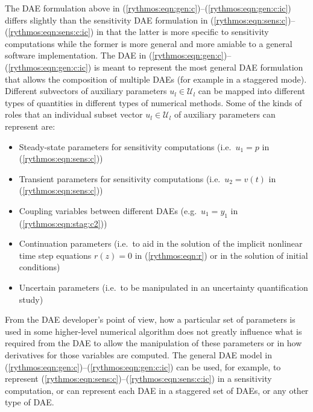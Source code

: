 \documentclass[pdf,ps2pdf,11pt]{SANDreport}
\begin{document}
The DAE formulation above in
(\ref{rythmos:eqn:gen:c})--(\ref{rythmos:eqn:gen:c:ic}) differs slightly than
the sensitivity DAE formulation in
(\ref{rythmos:eqn:sens:c})--(\ref{rythmos:eqn:sens:c:ic}) in that the latter
is more specific to sensitivity computations while the former is more general
and more amiable to a general software implementation.  The DAE in
(\ref{rythmos:eqn:gen:c})--(\ref{rythmos:eqn:gen:c:ic}) is meant to represent
the most general DAE formulation that allows the composition of multiple DAEs
(for example in a staggered mode).  Different subvectors of auxiliary
parameters $u_l\in\mathcal{U}_l$ can be mapped into different types of
quantities in different types of numerical methods.  Some of the kinds of
roles that an individual subset vector $u_l\in\mathcal{U}_l$ of auxiliary
parameters can represent are:
%
\begin{itemize}
%
{}\item Steady-state parameters for sensitivity computations (i.e.\ $u_1 =
p$ in (\ref{rythmos:eqn:sens:c}))
%
{}\item Transient parameters for sensitivity computations (i.e.\ $u_2 = v(t)$
in (\ref{rythmos:eqn:sens:c}))
%
{}\item Coupling variables between different DAEs (e.g.\ $u_1 = y_1$ in
(\ref{rythmos:eqn:stag:c2}))
%
{}\item Continuation parameters (i.e.\ to aid in the solution of the implicit
nonlinear time step equations $r(z)=0$ in (\ref{rythmos:eqn:r}) or in the
solution of initial conditions)
%
{}\item Uncertain parameters (i.e.\ to be manipulated in an uncertainty
quantification study)
%
\end{itemize}

From the DAE developer's point of view, how a particular set of parameters is
used in some higher-level numerical algorithm does not greatly influence what
is required from the DAE to allow the manipulation of these parameters or in
how derivatives for those variables are computed.  The general DAE model in
(\ref{rythmos:eqn:gen:c})--(\ref{rythmos:eqn:gen:c:ic}) can be used, for
example, to represent
(\ref{rythmos:eqn:sens:c})--(\ref{rythmos:eqn:sens:c:ic}) in a sensitivity
computation, or can represent each DAE in a staggered set of DAEs, or any
other type of DAE.
\end{document}
